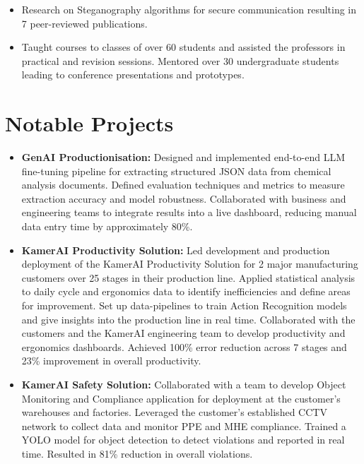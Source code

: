 \documentclass[a4paper,11pt]{article}
\begin{document}
      \begin{itemize}[leftmargin=*, itemsep = -2pt]
        \item {Research on Steganography algorithms for secure communication resulting in 7 peer-reviewed publications.}
        \item {Taught courses to classes of over 60 students and assisted the professors in practical and revision sessions. Mentored over 30 undergraduate students leading to conference presentations and prototypes.}
      \end{itemize}

\section{Notable Projects}
  \begin{itemize}[leftmargin=*, itemsep = -2pt]
    \item {\textbf{GenAI Productionisation:}} Designed and implemented end-to-end LLM fine-tuning pipeline for extracting structured JSON data from chemical analysis documents. Defined evaluation techniques and metrics to measure extraction accuracy and model robustness. Collaborated with business and engineering teams to integrate results into a live dashboard, reducing manual data entry time by approximately 80\%.
    \item {\textbf{KamerAI Productivity Solution:} Led development and production deployment of the KamerAI Productivity Solution for 2 major manufacturing customers over 25 stages in their production line. Applied statistical analysis to daily cycle and ergonomics data to identify inefficiencies and define areas for improvement. Set up data-pipelines to train Action Recognition models and give insights into the production line in real time. Collaborated with the customers and the KamerAI engineering team to develop productivity and ergonomics dashboards. Achieved 100\% error reduction across 7 stages and 23\% improvement in overall productivity.}
    \item {\textbf{KamerAI Safety Solution:} Collaborated with a team to develop Object Monitoring and Compliance application for deployment at the customer's warehouses and factories. Leveraged the customer's established CCTV network to collect data and monitor PPE and MHE compliance. Trained a YOLO model for object detection to detect violations and reported in real time. Resulted in 81\% reduction in overall violations.}
    
 
  \end{itemize}
\end{document}

